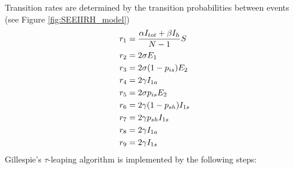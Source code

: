 Transition rates are determined by the transition probabilities between events (see Figure \ref{fig:SEEIIRH_model})
\begin{align} \notag
	r_1 &= \frac{\alpha I_{tot}+\beta I_h}{N-1} S \\ \notag
	r_2 &= 2\sigma E_1 \\ \notag
	r_3 &= 2\sigma (1 - p_{is}) E_2 \\ \notag
	r_4 &= 2\gamma I_{1a} \\ \notag
	r_5 &= 2\sigma p_{is} E_2 \\ \notag
	r_6 &= 2\gamma (1-p_{sh}) I_{1s} \\ \notag
	r_7 &= 2\gamma p_{sh} I_{1s}  \\ \notag
	r_8 &= 2\gamma I_{1a}  \\ \notag
	r_9 &= 2\gamma I_{1s}
\end{align}
Gillespie's $\tau$-leaping algorithm is implemented by the following steps:


